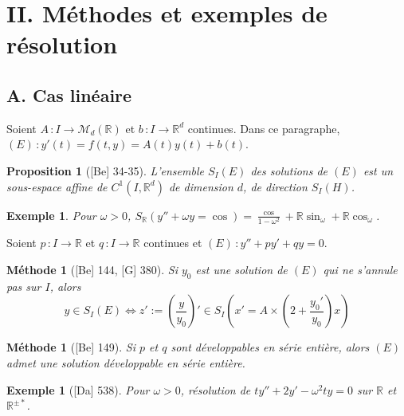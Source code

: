 \documentclass[10pt, a4paper, parskip=full, twoside, twocolumn]{report}
\newtheorem{methode}[definition]{Méthode}
\newtheorem{proposition}[definition]{Proposition}
\newtheorem{example}[definition]{Exemple}
\newcommand{\IR}{\mathbb{R}}
\newcommand{\M}{\mathcal{M}}
\begin{document}
\section*{II. Méthodes et exemples de résolution}
\subsection*{A. Cas linéaire}

\textcolor{paragraphtext}{Soient $A\,\colon I\to \M_d(\IR)$ et $b\,\colon I\to \IR^d$ continues. Dans ce paragraphe, $(E)\,\colon y'(t) = f(t,y)=A(t)y(t)+b(t)$.}

\begin{proposition}[\textnormal{[Be] 34-35}]
	L'ensemble $S_I(E)$ des solutions de $(E)$ est un sous-espace affine de $C^1(I,\IR^d)$ de dimension $d$, de direction $S_I(H)$.
\end{proposition}

\begin{example}
	Pour $\omega > 0$, $S_{\IR}(y''+\omega y = \cos) = \frac{\cos}{1-\omega^2} + \IR\sin_{\omega} + \IR\cos_{\omega}$.
\end{example}

\textcolor{paragraphtext}{Soient $p\,\colon I\to \IR$ et $q\,\colon I\to \IR$ continues et $(E)\,\colon y''+py'+qy = 0$.}

\begin{methode}[\textnormal{[Be] 144, [G] 380}]
Si $y_0$ est une solution de $(E)$ qui ne s'annule pas sur $I$, alors
$$y\in S_I(E) \iff z' := \left(\frac{y}{y_0}\right)' \in S_I(x' = A\times \left(2 + \frac{y_0'}{y_0}\right)x)$$
\end{methode}


\begin{methode}[\textnormal{[Be] 149}]
	Si $p$ et $q$ sont développables en série entière, alors $(E)$ admet une solution développable en série entière.
\end{methode}

\begin{tcolorbox}[
    breakable, %
    colback=developpement, %
    colframe=gray!0!black, %
    boxrule=0pt, %
    arc=1mm, %
	boxsep=0pt,
	left=0pt, right=0pt, top=0pt, bottom=0pt
]
\begin{example}[\textnormal{[Da] 538}]
	\label{220dev1}
	Pour $\omega > 0$, résolution de $ty''+2y'-\omega^2ty = 0$ sur $\IR$ et $\IR^{\pm*}$.
\end{example}
\end{tcolorbox}
\end{document}
